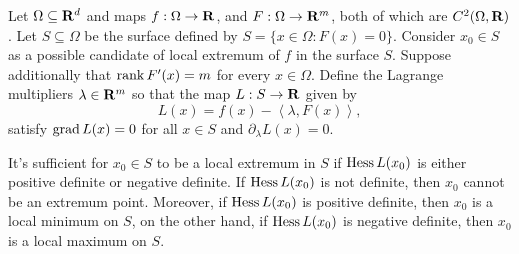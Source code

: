 \begin{theorem}
\label{thm:sufficient-extremum}
Let \(\Omega \subseteq \mathbf{R}^d\) and maps \(f: \Omega \to \mathbf{R}\), and  \(F: \Omega \to \mathbf{R}^m\), both of which
are \(C^2(\Omega, \mathbf{R})\). Let \(S \subseteq \Omega\) be the surface defined by \(S = \{x \in \Omega \colon
F(x) = 0\}\). Consider \(x_0 \in S\) as a possible candidate of local extremum
of \(f\) in the surface \(S\). Suppose additionally that \(\operatorname{rank} F'(x) =
m\) for every \(x \in \Omega\). Define the Lagrange multipliers \(\lambda \in \mathbf{R}^m\) so that
the map \(L: S \to \mathbf{R}\) given by
\[
  L(x) = f(x) - \left\langle \lambda, F(x) \right\rangle,
\]
satisfy \(\operatorname{grad} L(x) = 0\) for all \(x \in S\) and \(\partial_{\lambda} L(x) = 0\).

It's sufficient for \(x_0 \in S\) to be a local extremum in \(S\) if \(\operatorname{Hess}
L(x_0)\) is either positive definite or negative definite. If \(\operatorname{Hess} L(x_0)\)
is not definite, then \(x_0\) cannot be an extremum point. Moreover, if \(\operatorname{Hess}
L(x_0)\) is positive definite, then \(x_0\) is a local minimum on \(S\), on the
other hand, if \(\operatorname{Hess} L(x_0)\) is negative definite, then \(x_0\) is a local
maximum on \(S\).
\end{theorem}

